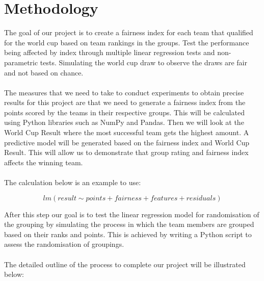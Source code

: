 \documentclass[11pt,a4paper]{article}
\begin{document}
\section{Methodology}


The goal of our project is to create a fairness index for each team that qualified for the world cup based on team rankings in the groups. Test the performance being affected by index through multiple linear regression tests and non-parametric tests. Simulating the world cup draw to observe the draws are fair and not based on chance.
\\ \\
The measures that we need to take to conduct experiments to obtain precise results for this project are that we need to generate a fairness index from the points scored by the teams in their respective groups. This will be calculated using Python libraries such as NumPy and Pandas. Then we will look at the World Cup Result where the most successful team gets the highest amount. A predictive model will be generated based on the fairness index and World Cup Result. This will allow us to demonstrate that group rating and fairness index affects the winning team.
\\ \\
The calculation below is an example to use:


\begin{equation*}
lm(result \sim points+fairness+features+residuals)
\end{equation*}

After this step our goal is to test the linear regression model for randomisation of the grouping by simulating the process in which the team members are grouped based on their ranks and points. This is achieved by writing a Python script to assess the randomisation of groupings.
\\ \\
The detailed outline of the process to complete our project will be illustrated below:
\end{document}
